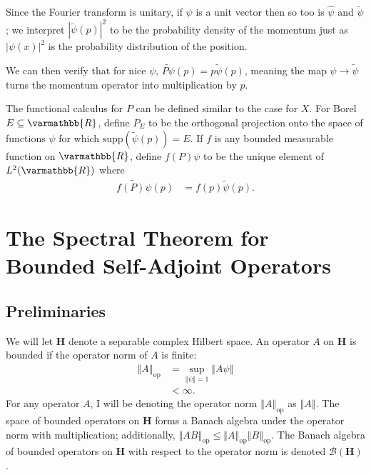 \documentclass[12pt]{extarticle}
\newcommand{\R}{\varmathbb{R}}
\newcommand{\norm}[1]{\left\Vert #1\right\Vert}
\theoremstyle{plain}
\theoremstyle{definition}
\theoremstyle{remark}
\renewcommand{\newline}{\hfill\break}
\begin{document}
  Since the Fourier transform is unitary, if $\psi$ is a unit vector then so too is $\hat{\psi}$ and $\tilde{\psi}$; we interpret $|\tilde{\psi}(p)|^2$ to be the probability density of the momentum just as $\left\vert \psi(x) \right\vert^2$ is the probability distribution of the position.\newline

  We can then verify that for nice $\psi$, $\widetilde{P\psi}(p) = p\tilde{\psi}(p)$, meaning the map $\psi \rightarrow \tilde{\psi}$ turns the momentum operator into multiplication by $p$.\newline

  The functional calculus for $P$ can be defined similar to the case for $X$. For Borel $E\subseteq \R$, define $P_E$ to be the orthogonal projection onto the space of functions $\psi$ for which $\text{supp}(\tilde{\psi}(p)) = E$. If $f$ is any bounded measurable function on $\R$, define $f(P)\psi$ to be the unique element of $L^{2}(\R)$ where
  \begin{align*}
    \widetilde{f(P)\psi}(p) &= f(p)\tilde{\psi}(p).
  \end{align*}
  \section{The Spectral Theorem for Bounded Self-Adjoint Operators}%
  \subsection{Preliminaries}%
  We will let $\mathbf{H}$ denote a separable complex Hilbert space. An operator $A$ on $\mathbf{H}$ is bounded if the operator norm of $A$ is finite:
  \begin{align*}
    \norm{A}_{\text{op}} &= \sup_{\norm{\psi} = 1}\norm{A\psi}\\
                         &< \infty.
  \end{align*}
  For any operator $A$, I will be denoting the operator norm $\norm{A}_{\text{op}} $ as $ \norm{A}$. The space of bounded operators on $\mathbf{H}$ forms a Banach algebra under the operator norm with multiplication; additionally, $\norm{AB}_{\text{op}}\leq \norm{A}_{\text{op}}\norm{B}_{\text{op}}$. The Banach algebra of bounded operators on $\mathbf{H}$ with respect to the operator norm is denoted $\mathcal{B}(\mathbf{H})$.\newline
\end{document}
